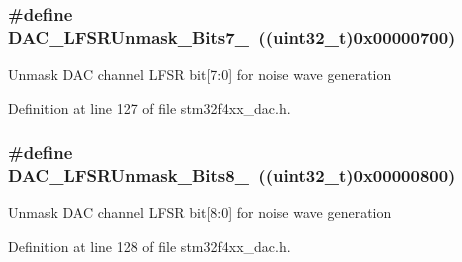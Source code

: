 \hypertarget{group___d_a_c__lfsrunmask__triangleamplitude_gaf0a93c1ee1e13776fae7558b36243431}{
\subsubsection[{D\-A\-C\-\_\-\-L\-F\-S\-R\-Unmask\-\_\-\-Bits7\-\_\-0}]{\setlength{\rightskip}{0pt plus 5cm}\#define D\-A\-C\-\_\-\-L\-F\-S\-R\-Unmask\-\_\-\-Bits7\-\_~((uint32\-\_\-t)0x00000700)}}\label{group___d_a_c__lfsrunmask__triangleamplitude_gaf0a93c1ee1e13776fae7558b36243431}
Unmask D\-A\-C channel L\-F\-S\-R bit\mbox{[}7\-:0\mbox{]} for noise wave generation 

Definition at line 127 of file stm32f4xx\-\_\-dac.\-h.

\hypertarget{group___d_a_c__lfsrunmask__triangleamplitude_ga4f56965841d9d91ca5b6de43ee589598}{
\subsubsection[{D\-A\-C\-\_\-\-L\-F\-S\-R\-Unmask\-\_\-\-Bits8\-\_\-0}]{\setlength{\rightskip}{0pt plus 5cm}\#define D\-A\-C\-\_\-\-L\-F\-S\-R\-Unmask\-\_\-\-Bits8\-\_~((uint32\-\_\-t)0x00000800)}}\label{group___d_a_c__lfsrunmask__triangleamplitude_ga4f56965841d9d91ca5b6de43ee589598}
Unmask D\-A\-C channel L\-F\-S\-R bit\mbox{[}8\-:0\mbox{]} for noise wave generation 

Definition at line 128 of file stm32f4xx\-\_\-dac.\-h.

